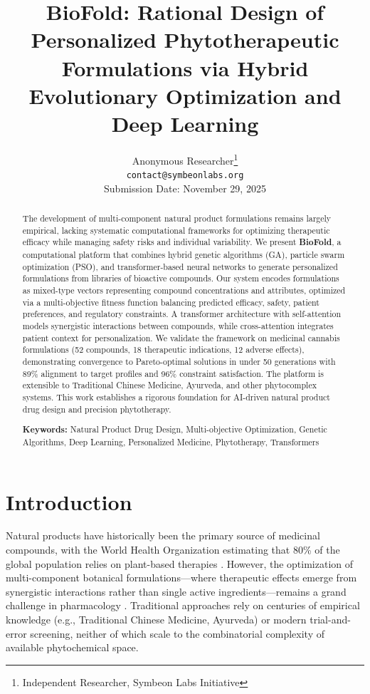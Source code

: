 \documentclass[11pt,a4paper]{article}
\title{\textbf{BioFold: Rational Design of Personalized Phytotherapeutic Formulations via Hybrid Evolutionary Optimization and Deep Learning}}
\author{
  Anonymous Researcher\footnote{Independent Researcher, Symbeon Labs Initiative} \\
  \texttt{contact@symbeonlabs.org} \\
  Submission Date: November 29, 2025
}
\date{}
\begin{document}
\maketitle

\begin{abstract}
The development of multi-component natural product formulations remains largely empirical, lacking systematic computational frameworks for optimizing therapeutic efficacy while managing safety risks and individual variability. We present \textbf{BioFold}, a computational platform that combines hybrid genetic algorithms (GA), particle swarm optimization (PSO), and transformer-based neural networks to generate personalized formulations from libraries of bioactive compounds. Our system encodes formulations as mixed-type vectors representing compound concentrations and attributes, optimized via a multi-objective fitness function balancing predicted efficacy, safety, patient preferences, and regulatory constraints. A transformer architecture with self-attention models synergistic interactions between compounds, while cross-attention integrates patient context for personalization. We validate the framework on medicinal cannabis formulations (52 compounds, 18 therapeutic indications, 12 adverse effects), demonstrating convergence to Pareto-optimal solutions in under 50 generations with 89\% alignment to target profiles and 96\% constraint satisfaction. The platform is extensible to Traditional Chinese Medicine, Ayurveda, and other phytocomplex systems. This work establishes a rigorous foundation for AI-driven natural product drug design and precision phytotherapy.

\textbf{Keywords:} Natural Product Drug Design, Multi-objective Optimization, Genetic Algorithms, Deep Learning, Personalized Medicine, Phytotherapy, Transformers
\end{abstract}

\section{Introduction}

Natural products have historically been the primary source of medicinal compounds, with the World Health Organization estimating that 80\% of the global population relies on plant-based therapies \cite{WHO2019}. However, the optimization of multi-component botanical formulations—where therapeutic effects emerge from synergistic interactions rather than single active ingredients—remains a grand challenge in pharmacology \cite{Russo2011,Yuan2016}. Traditional approaches rely on centuries of empirical knowledge (e.g., Traditional Chinese Medicine, Ayurveda) or modern trial-and-error screening, neither of which scale to the combinatorial complexity of available phytochemical space.
\end{document}
